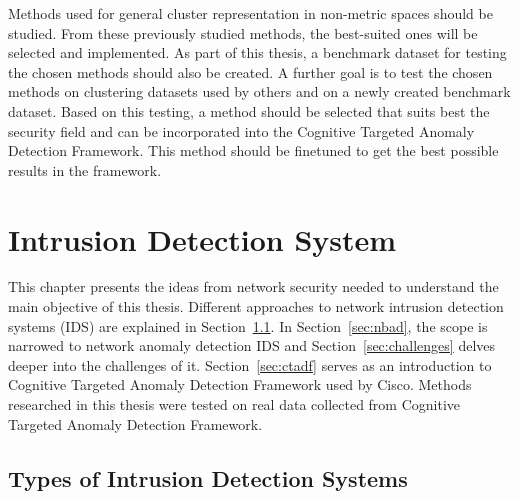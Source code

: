 \documentclass[thesis=B,english]{FITthesis}[2012/10/20]
\begin{document}
Methods used for general cluster representation in non-metric spaces should be studied.
From these previously studied methods, the best-suited ones will be selected and implemented.
As part of this thesis, a benchmark dataset for testing the chosen methods should also be created.
A further goal is to test the chosen methods on clustering datasets used by others and on a newly created benchmark dataset.
Based on this testing, a method should be selected that suits best the security field and can be incorporated into the Cognitive Targeted Anomaly Detection Framework.
This method should be finetuned to get the best possible results in the framework.



\chapter{Intrusion Detection System}\label{ch:ids}

This chapter presents the ideas from network security needed to understand the main objective of this thesis.
Different approaches to network intrusion detection systems (IDS) are explained in Section~\ref{sec:ids}.
In Section~\ref{sec:nbad}, the scope is narrowed to network anomaly detection IDS and Section~\ref{sec:challenges} delves deeper into the challenges of it.
Section~\ref{sec:ctadf} serves as an introduction to Cognitive Targeted Anomaly Detection Framework used by Cisco.
Methods researched in this thesis were tested on real data collected from Cognitive Targeted Anomaly Detection Framework.

\section{Types of Intrusion Detection Systems}\label{sec:ids}
\end{document}
